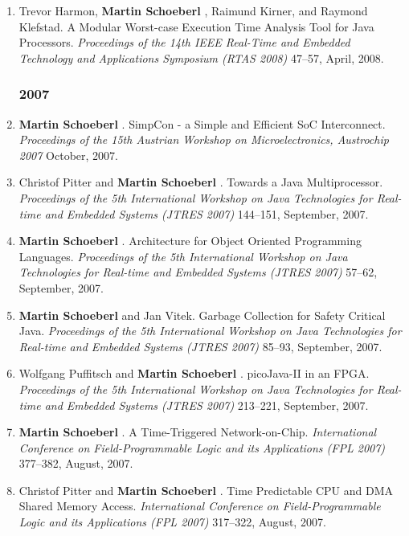 \begin{enumerate}
\item Trevor Harmon, {\bf Martin Schoeberl }, Raimund Kirner, and Raymond Klefstad.
 A Modular Worst-case Execution Time Analysis Tool for Java Processors.
 \emph{Proceedings of the 14th IEEE Real-Time and Embedded Technology and Applications Symposium (RTAS 2008)} 47--57, April, 2008.


\subsubsection*{2007}

\item {\bf Martin Schoeberl }.
 SimpCon - a Simple and Efficient SoC Interconnect.
 \emph{Proceedings of the 15th Austrian Workshop on Microelectronics, Austrochip 2007} October, 2007.

\item Christof Pitter and {\bf Martin Schoeberl }.
 Towards a Java Multiprocessor.
 \emph{Proceedings of the 5th International Workshop on Java Technologies for Real-time and Embedded Systems (JTRES 2007)} 144--151, September, 2007.

\item {\bf Martin Schoeberl }.
 Architecture for Object Oriented Programming Languages.
 \emph{Proceedings of the 5th International Workshop on Java Technologies for Real-time and Embedded Systems (JTRES 2007)} 57--62, September, 2007.

\item {\bf Martin Schoeberl } and Jan Vitek.
 Garbage Collection for Safety Critical Java.
 \emph{Proceedings of the 5th International Workshop on Java Technologies for Real-time and Embedded Systems (JTRES 2007)} 85--93, September, 2007.

\item Wolfgang Puffitsch and {\bf Martin Schoeberl }.
 picoJava-II in an FPGA.
 \emph{Proceedings of the 5th International Workshop on Java Technologies for Real-time and Embedded Systems (JTRES 2007)} 213--221, September, 2007.

\item {\bf Martin Schoeberl }.
 A Time-Triggered Network-on-Chip.
 \emph{International Conference on Field-Programmable Logic and its Applications (FPL 2007)} 377--382, August, 2007.

\item Christof Pitter and {\bf Martin Schoeberl }.
 Time Predictable CPU and DMA Shared Memory Access.
 \emph{International Conference on Field-Programmable Logic and its Applications (FPL 2007)} 317--322, August, 2007.


\end{enumerate}
